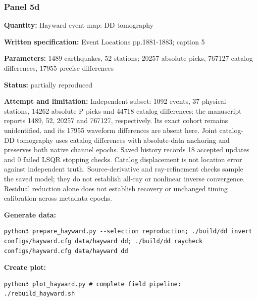 \subsubsection*{Panel 5d}
\noindent\textbf{Quantity:} Hayward event map: DD tomography\par
\noindent\textbf{Written specification:} Event Locations pp.1881-1883; caption 5\par
\noindent\textbf{Parameters:} 1489 earthquakes, 52 stations; 20257 absolute picks, 767127 catalog differences, 17955 precise differences\par
\noindent\textbf{Status:} partially reproduced\par
\noindent\textbf{Attempt and limitation:} Independent subset: 1092 events, 37 physical stations, 14262 absolute P picks and 44718 catalog differences; the manuscript reports 1489, 52, 20257 and 767127, respectively. Its exact cohort remains unidentified, and its 17955 waveform differences are absent here. Joint catalog-DD tomography uses catalog differences with absolute-data anchoring and preserves both native channel epochs. Saved history records 18 accepted updates and 0 failed LSQR stopping checks. Catalog displacement is not location error against independent truth. Source-derivative and ray-refinement checks sample the saved model; they do not establish all-ray or nonlinear inverse convergence. Residual reduction alone does not establish recovery or unchanged timing calibration across metadata epochs.\par
\noindent\textbf{Generate data:}
\begin{lstlisting}
python3 prepare_hayward.py --selection reproduction; ./build/dd invert configs/hayward.cfg data/hayward dd; ./build/dd raycheck configs/hayward.cfg data/hayward dd
\end{lstlisting}
\noindent\textbf{Create plot:}
\begin{lstlisting}
python3 plot_hayward.py # complete field pipeline: ./rebuild_hayward.sh
\end{lstlisting}
